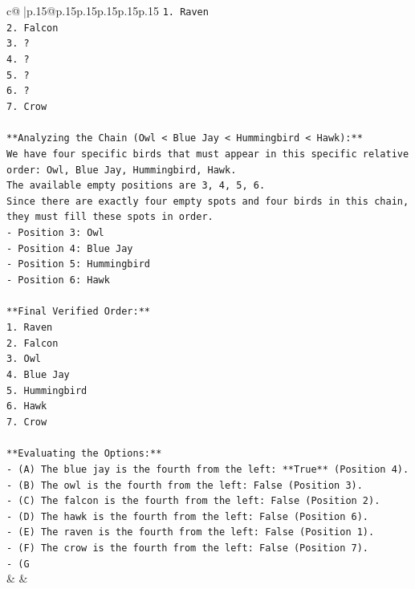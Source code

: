\documentclass{article}
\begin{document}
{\begin{supertabular}{c@{$\;$}|p{.15\linewidth}@{}p{.15\linewidth}p{.15\linewidth}p{.15\linewidth}p{.15\linewidth}p{.15\linewidth}}
{{{\texttt{1. Raven} \\
\texttt{2. Falcon} \\
\texttt{3. ?} \\
\texttt{4. ?} \\
\texttt{5. ?} \\
\texttt{6. ?} \\
\texttt{7. Crow} \\
\\ 
\texttt{**Analyzing the Chain (Owl < Blue Jay < Hummingbird < Hawk):**} \\
\texttt{We have four specific birds that must appear in this specific relative order: Owl, Blue Jay, Hummingbird, Hawk.} \\
\texttt{The available empty positions are 3, 4, 5, 6.} \\
\texttt{Since there are exactly four empty spots and four birds in this chain, they must fill these spots in order.} \\
\texttt{{-} Position 3: Owl} \\
\texttt{{-} Position 4: Blue Jay} \\
\texttt{{-} Position 5: Hummingbird} \\
\texttt{{-} Position 6: Hawk} \\
\\ 
\texttt{**Final Verified Order:**} \\
\texttt{1. Raven} \\
\texttt{2. Falcon} \\
\texttt{3. Owl} \\
\texttt{4. Blue Jay} \\
\texttt{5. Hummingbird} \\
\texttt{6. Hawk} \\
\texttt{7. Crow} \\
\\ 
\texttt{**Evaluating the Options:**} \\
\texttt{{-} (A) The blue jay is the fourth from the left: **True** (Position 4).} \\
\texttt{{-} (B) The owl is the fourth from the left: False (Position 3).} \\
\texttt{{-} (C) The falcon is the fourth from the left: False (Position 2).} \\
\texttt{{-} (D) The hawk is the fourth from the left: False (Position 6).} \\
\texttt{{-} (E) The raven is the fourth from the left: False (Position 1).} \\
\texttt{{-} (F) The crow is the fourth from the left: False (Position 7).} \\
\texttt{{-} (G} \\
            }
        }
    }
    & & \\ \\


\end{supertabular}}
\end{document}
